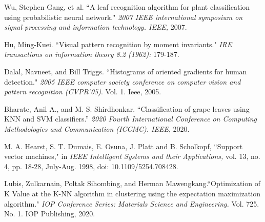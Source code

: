 \documentclass[a4paper]{article}
\begin{document}
\renewcommand{\refname}{Tài liệu tham khảo}
\begin{thebibliography}{99}

 Wu, Stephen Gang, et al. ``A leaf recognition algorithm for plant classification using probabilistic neural network." {\it 2007 IEEE international symposium on signal processing and information technology. IEEE,} 2007.

 Hu, Ming-Kuei. ``Visual pattern recognition by moment invariants." {\it IRE transactions on information theory 8.2 (1962):} 179-187.

 Dalal, Navneet, and Bill Triggs. ``Histograms of oriented gradients for human detection." {\it 2005 IEEE computer society conference on computer vision and pattern recognition (CVPR'05)}. Vol. 1. Ieee, 2005.

 Bharate, Anil A., and M. S. Shirdhonkar. ``Classification of grape leaves using KNN and SVM classifiers.'' {\it 2020 Fourth International Conference on Computing Methodologies and Communication (ICCMC). IEEE}, 2020.

 M. A. Hearst, S. T. Dumais, E. Osuna, J. Platt and B. Scholkopf, ``Support vector machines," in {\it IEEE Intelligent Systems and their Applications,} vol. 13, no. 4, pp. 18-28, July-Aug. 1998, doi: 10.1109/5254.708428.

 Lubis, Zulkarnain, Poltak Sihombing, and Herman Mawengkang.``Optimization of K Value at the K-NN algorithm in clustering using the expectation maximization algorithm." {\it IOP Conference Series: Materials Science and Engineering.} Vol. 725. No. 1. IOP Publishing, 2020.
\end{thebibliography}
\end{document}

